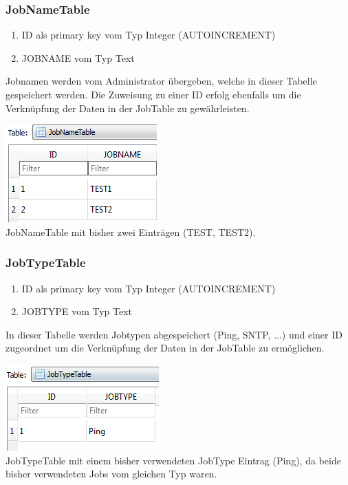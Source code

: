 \documentclass[12pt,a4paper]{report}
\begin{document}
\begin{onehalfspace}
\subsubsection{JobNameTable}
\begin{enumerate}
\item ID als primary key vom Typ Integer (AUTOINCREMENT)
\item JOBNAME vom Typ Text
\end{enumerate}
Jobnamen werden vom Administrator übergeben, welche in dieser Tabelle gespeichert werden. Die Zuweisung zu einer ID erfolg ebenfalls um die Verknüpfung der Daten in der JobTable zu gewährleisten.
\begin{center}
\includegraphics[scale=0.8]{img/db-tb-jobname.png}\\
JobNameTable mit bisher zwei Einträgen (TEST, TEST2).
\end{center}
\subsubsection{JobTypeTable}
\begin{enumerate}
\item ID als primary key vom Typ Integer (AUTOINCREMENT)
\item JOBTYPE vom Typ Text
\end{enumerate}
In dieser Tabelle werden Jobtypen abgespeichert (Ping, SNTP, ...) und einer ID zugeordnet um die Verknüpfung der Daten in der JobTable zu ermöglichen.
\begin{center}
\includegraphics[scale=0.8]{img/db-tb-jobtype.png}\\
JobTypeTable mit einem bisher verwendeten JobType Eintrag (Ping), da beide bisher verwendeten Jobs vom gleichen Typ waren.
\end{center}

\end{onehalfspace}
\end{document}
